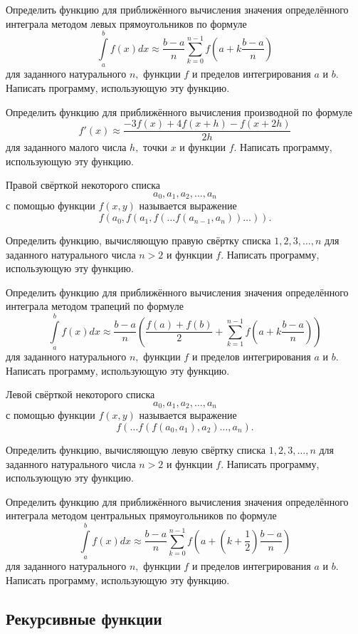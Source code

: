 \task Определить функцию для приближённого вычисления значения
определённого интеграла методом левых прямоугольников по формуле
\[
\int\limits_a^b f(x) dx \approx
\frac{b-a}{n}\sum_{k=0}^{n-1} f \left(a + k\frac{b-a}{n}\right)
\]
для заданного натурального $n,$ функции $f$ и пределов интегрирования
$a$ и $b.$ Написать программу, использующую эту функцию.

\task Определить функцию для приближённого вычисления производной по
формуле
\[
f'(x) \approx \frac{-3f(x) + 4f(x+h) - f(x+2h)}{2h}
\]
для заданного малого числа $h,$ точки $x$ и функции $f.$ Написать
программу, использующую эту функцию.

\task Правой свёрткой некоторого списка
\[
a_0, a_1, a_2, \ldots, a_n
\]
с помощью функции $f(x, y)$ называется выражение
\[
f(a_0, f(a_1, f(\ldots f(a_{n-1}, a_n)) \ldots)). 
\]

Определить функцию, вычисляющую правую свёртку списка $1, 2, 3,
\ldots, n$ для заданного натурального числа $n > 2$ и функции
$f$. Написать программу, использующую эту функцию.

\task Определить функцию для приближённого вычисления значения
определённого интеграла методом трапеций по формуле
\[
\int\limits_a^b f(x) dx \approx
\frac{b-a}{n}\left(
\frac{f(a)+f(b)}2 + \sum_{k=1}^{n-1} f \left(a + k\frac{b-a}{n}\right)
\right)
\]
для заданного натурального $n,$ функции $f$ и пределов интегрирования
$a$ и $b.$ Написать программу, использующую эту функцию.

\task Левой свёрткой некоторого списка
\[
a_0, a_1, a_2, \ldots, a_n
\]
с помощью функции $f(x, y)$ называется выражение
\[
f(\ldots f(f(a_0, a_1), a_2) \ldots, a_n). 
\]

Определить функцию, вычисляющую левую свёртку списка $1, 2, 3, \ldots,
n$ для заданного натурального числа $n > 2$ и функции $f.$ Написать
программу, использующую эту функцию.

\task Определить функцию для приближённого вычисления значения
определённого интеграла методом центральных прямоугольников по формуле
\[
\int\limits_a^b f(x) dx \approx
\frac{b-a}{n}\sum_{k=0}^{n-1} f \left(
a + \left(k+\frac{1}{2}\right)\frac{b-a}{n}
\right)
\]
для заданного натурального $n,$ функции $f$ и пределов интегрирования
$a$ и $b.$ Написать программу, использующую эту функцию.


\subsection{Рекурсивные функции}

